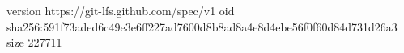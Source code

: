version https://git-lfs.github.com/spec/v1
oid sha256:591f73aded6c49e3e6ff227ad7600d8b8ad8a4e8d4ebe56f0f60d84d731d26a3
size 227711
